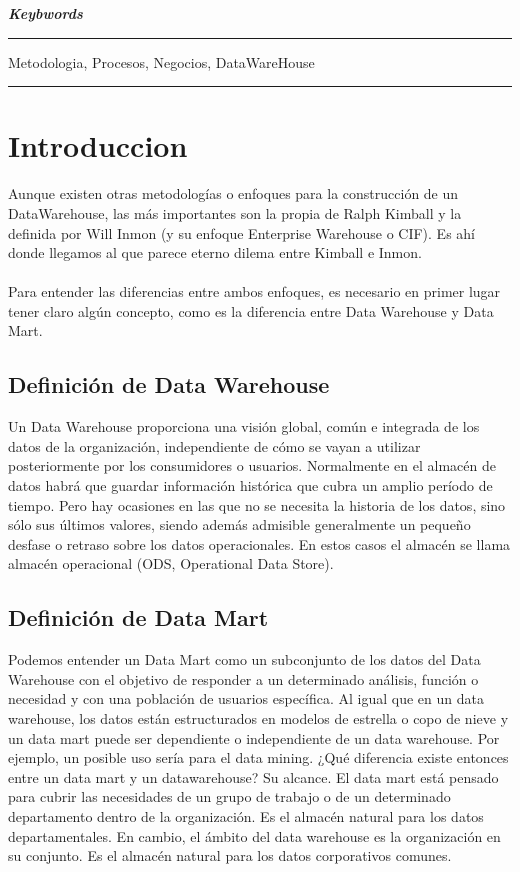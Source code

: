 \documentclass[11pt,a4paper]{article}
\begin{document}
		\vspace{\baselineskip}
		
		\textbf{\textit{\large Keybwords}}\rule[1.5mm]{5mm}{0.1mm} 
		Metodologia, Procesos, Negocios, DataWareHouse
		
						
		\rule{167mm}{0.1mm}
		
		\vspace{\baselineskip}
		
		\section{Introduccion}
		
		Aunque existen otras metodologías o enfoques para la construcción de un DataWarehouse, las más importantes son la propia de Ralph Kimball y la definida por Will Inmon (y su enfoque Enterprise Warehouse o CIF). Es ahí donde llegamos al que parece eterno dilema entre Kimball e Inmon.\\
		\\
		Para entender las diferencias entre ambos enfoques, es necesario en primer lugar tener claro algún concepto, como es la diferencia entre Data Warehouse y Data Mart.
		
			\subsection{Definición de Data Warehouse}
			Un Data Warehouse proporciona una visión global, común e integrada de los datos de la organización, independiente de cómo se vayan a utilizar posteriormente por los consumidores o usuarios. Normalmente en el almacén de datos habrá que guardar información histórica que cubra un amplio período de tiempo. Pero hay ocasiones en las que no se necesita la historia de los datos, sino sólo sus últimos valores, siendo además admisible generalmente un pequeño desfase o retraso sobre los datos operacionales. En estos casos el almacén se llama almacén operacional (ODS, Operational Data Store).
			
			\subsection{Definición de Data Mart}
			Podemos entender un Data Mart como un subconjunto de los datos del Data Warehouse con el objetivo de responder a un determinado análisis, función o necesidad y con una población de usuarios específica. Al igual que en un data warehouse, los datos están estructurados en modelos de estrella o copo de nieve y un data mart puede ser dependiente o independiente de un data warehouse. Por ejemplo, un posible uso sería para el data mining. ¿Qué diferencia existe entonces entre un data mart y un datawarehouse? Su alcance. El data mart está pensado para cubrir las necesidades de un grupo de trabajo o de un determinado departamento dentro de la organización. Es el almacén natural para los datos departamentales. En cambio, el ámbito del data warehouse es la organización en su conjunto. Es el almacén natural para los datos corporativos comunes.
						
\end{document}
